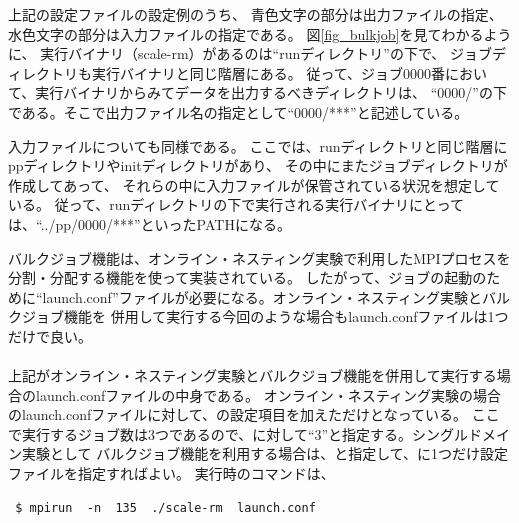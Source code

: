 \noindent 上記の設定ファイルの設定例のうち、
青色文字の部分は出力ファイルの指定、
水色文字の部分は入力ファイルの指定である。
図\ref{fig_bulkjob}を見てわかるように、
実行バイナリ（scale-rm）があるのは``runディレクトリ''の下で、
ジョブディレクトリも実行バイナリと同じ階層にある。
従って、ジョブ0000番において、実行バイナリからみてデータを出力するべきディレクトリは、
``0000/''の下である。そこで出力ファイル名の指定として``0000/***''と記述している。

入力ファイルについても同様である。
ここでは、runディレクトリと同じ階層にppディレクトリやinitディレクトリがあり、
その中にまたジョブディレクトリが作成してあって、
それらの中に入力ファイルが保管されている状況を想定している。
従って、runディレクトリの下で実行される実行バイナリにとっては、``../pp/0000/***''といったPATHになる。

バルクジョブ機能は、オンライン・ネスティング実験で利用したMPIプロセスを分割・分配する機能を使って実装されている。
したがって、ジョブの起動のために``launch.conf''ファイルが必要になる。オンライン・ネスティング実験とバルクジョブ機能を
併用して実行する今回のような場合もlaunch.confファイルは1つだけで良い。\\

\\

\noindent 上記がオンライン・ネスティング実験とバルクジョブ機能を併用して実行する場合のlaunch.confファイルの中身である。
オンライン・ネスティング実験の場合のlaunch.confファイルに対して、の設定項目を加えただけとなっている。
ここで実行するジョブ数は3つであるので、に対して``3''と指定する。シングルドメイン実験として
バルクジョブ機能を利用する場合は、と指定して、に1つだけ設定ファイルを指定すればよい。
実行時のコマンドは、

\begin{verbatim}
 $ mpirun  -n  135  ./scale-rm  launch.conf
\end{verbatim}

